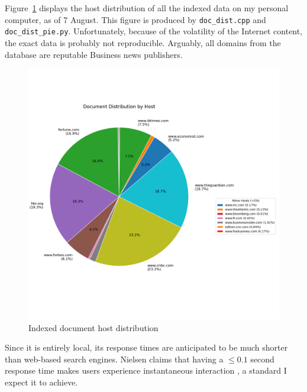 \documentclass[final-report]{report-template}
\newcommand\ttb{\discretionary{}{}{}}
\begin{document}
Figure~\ref{fig.index.host.dist} displays the host distribution of all the
indexed data on my personal computer, as of 7 August. This figure is produced
by \texttt{doc\_\ttb dist.cpp} and \texttt{doc\_\ttb dist\_\ttb pie.py}.
Unfortunately, because of the volatility of the Internet content, the exact
data is probably not reproducible. Arguably, all domains from the database
are reputable Business news publishers.
\begin{figure}[hbtp!]
	\centering
	\includegraphics[height=.35\textheight]{res/doc_host_dist.png}
	\caption{Indexed document host distribution}
	\label{fig.index.host.dist}
\end{figure}

Since it is entirely local, its response times are anticipated to be much
shorter than web-based search engines. Nielsen claims that having a $\le 0.1$
second response time makes users experience instantaneous interaction
\cite[Chapter~5]{usability.eng}, a standard I expect it to achieve.
\end{document}
